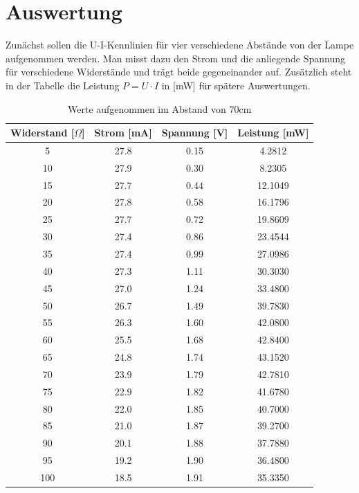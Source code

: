 \section{Auswertung}
Zunächst sollen die U-I-Kennlinien für vier verschiedene Abstände von der Lampe aufgenommen werden. Man misst dazu den Strom und die anliegende Spannung für verschiedene Widerstände und trägt beide gegeneinander auf. Zusätzlich steht in der Tabelle die Leistung $P=U \cdot I$ in [mW] für spätere Auswertungen.

\begin{table}[htbp]
\begin{tabular}{|c|c|c|c|}
\hline 
Widerstand [$\Omega$]	&Strom [mA]	&Spannung [V]	&Leistung [mW]\\	
\hline
5	&27.8	&0.15	&4.2812\\
10	&27.9	&0.30	&8.2305\\
15	&27.7	&0.44	&12.1049\\
20	&27.8	&0.58	&16.1796\\
25	&27.7	&0.72	&19.8609\\
30	&27.4	&0.86	&23.4544\\
35	&27.4	&0.99	&27.0986\\
40	&27.3	&1.11	&30.3030\\
45	&27.0	&1.24	&33.4800\\
50	&26.7	&1.49	&39.7830\\
55	&26.3	&1.60	&42.0800\\
60	&25.5	&1.68	&42.8400\\
65	&24.8	&1.74	&43.1520\\
70	&23.9	&1.79	&42.7810\\
75	&22.9	&1.82	&41.6780\\
80	&22.0	&1.85	&40.7000\\
85	&21.0	&1.87	&39.2700\\
90	&20.1	&1.88	&37.7880\\
95	&19.2	&1.90	&36.4800\\
100	&18.5	&1.91	&35.3350\\
\hline 
\end{tabular}
\caption{Werte aufgenommen im Abstand von 70cm}
\end{table}
 
